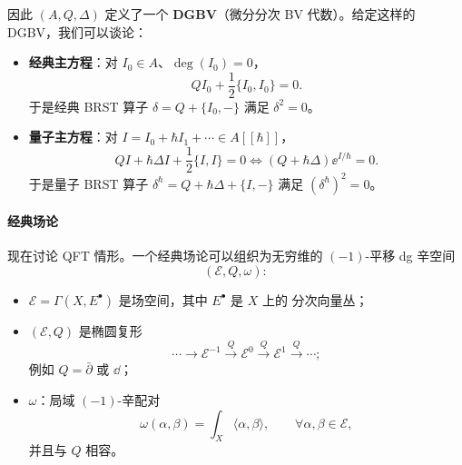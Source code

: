 
因此 $(A,Q,\Delta)$ 定义了一个 \textbf{DGBV}（微分分次 BV 代数）。给定这样的
DGBV，我们可以谈论：
\begin{itemize}[leftmargin=1.6em,itemsep=0.25em]
  \item \textbf{经典主方程}：对 $I_0\in A$、$\deg(I_0)=0$，
        \[
          QI_0+\frac{1}{2}\{I_0,I_0\}=0.
        \]
        于是经典 BRST 算子 $\delta=Q+\{I_0,-\}$ 满足 $\delta^2=0$。
  \item \textbf{量子主方程}：对 $I=I_0+\hbar I_1+\cdots\in A[[\hbar]]$，
        \[
          QI+\hbar\Delta I+\frac{1}{2}\{I,I\}=0
          \iff (Q+\hbar\Delta)\ee^{I/\hbar}=0.
        \]
        于是量子 BRST 算子 $\delta^\hbar=Q+\hbar\Delta+\{I,-\}$ 满足
        $(\delta^\hbar)^2=0$。
\end{itemize}



\paragraph{经典场论}

现在讨论 QFT 情形。一个经典场论可以组织为无穷维的 $(-1)$-平移 dg 辛空间
\[
  (\mathcal{E},Q,\omega):
\]
\begin{itemize}[leftmargin=1.6em,itemsep=0.2em]
  \item $\mathcal{E}=\Gamma(X,E^{\bullet})$ 是场空间，其中 $E^{\bullet}$ 是 $X$ 上的
        分次向量丛；
  \item $(\mathcal{E},Q)$ 是椭圆复形
        \[
          \cdots\longrightarrow\mathcal{E}^{-1}\xrightarrow{\ Q\ }\mathcal{E}^{0}
          \xrightarrow{\ Q\ }\mathcal{E}^{1}\xrightarrow{\ Q\ }\cdots;
        \]
        例如 $Q=\bar\partial$ 或 $\dd$；
  \item $\omega$：局域 $(-1)$-辛配对
        \[
          \omega(\alpha,\beta)=\int_X\langle\alpha,\beta\rangle,
          \qquad \forall\alpha,\beta\in\mathcal{E},
        \]
        并且与 $Q$ 相容。
\end{itemize}

